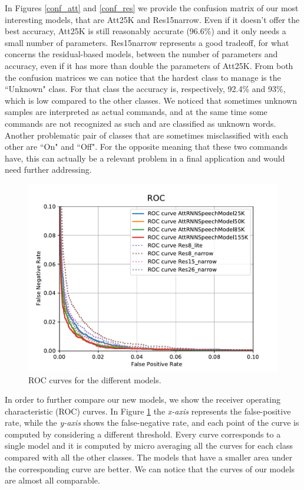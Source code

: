 In Figures \ref{conf_att} and \ref{conf_res} we provide the confusion matrix of our most interesting models, that are Att25K and Res15narrow. Even if it doesn't offer the best accuracy, Att25K is still reasonably accurate (96.6\%) and it only needs a small number of parameters.
Res15narrow represents a good tradeoff, for what concerns the residual-based models, between the number of parameters and accuracy, even if it has more than double the parameters of Att25K.
From both the confusion matrices we can notice that the hardest class to manage is the ``Unknown" class.
For that class the accuracy is, respectively, 92.4\% and 93\%, which is low compared to the other classes. We noticed that sometimes unknown samples are interpreted as actual commands, and at the same time some commands are not recognized as such and are classified as unknown words. Another problematic pair of classes that are sometimes misclassified with each other are ``On" and ``Off". For the opposite meaning that these two commands have, this can actually be a relevant problem in a final application and would need further addressing.


\begin{figure}[htbp]
\centerline{\includegraphics[scale=.5]{ROC.pdf}}
\caption{ROC curves for the different models.}
\label{roc}
\end{figure}

In order to further compare our new models, we show the receiver operating characteristic (ROC) curves. In Figure \ref{roc} the \textit{x-axis} represents the false-positive rate, while the \textit{y-axis} shows the false-negative rate, and each point of the curve is computed by considering a different threshold. Every curve corresponds to a single model and it is computed by micro averaging all the curves for each class compared with all the other classes. The models that have a smaller area under the corresponding curve are better. We can notice that the curves of our models are almost all comparable.
